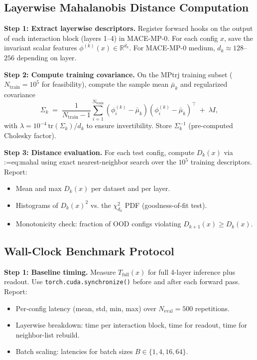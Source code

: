 \documentclass[11pt,a4paper]{article}
\makeatletter
\newcommand{\cref}[1]{\begingroup\def\crefsep{}\@for\crefitem:=#1\do{\crefsep\ref{\crefitem}\def\crefsep{, }}\endgroup}
\makeatother
\begin{document}
\subsection{Layerwise Mahalanobis Distance Computation}\label{sec:empirical:mahal}

\textbf{Step 1: Extract layerwise descriptors.} Register forward hooks on the output of each interaction block (layers 1--4) in MACE-MP-0. For each config $x$, save the invariant scalar features $\phi^{(k)}(x)\in\mathbb{R}^{d_k}$. For MACE-MP-0 medium, $d_k\approx 128$--$256$ depending on layer.

\textbf{Step 2: Compute training covariance.} On the MPtrj training subset ($N_{\text{train}}=10^5$ for feasibility), compute the sample mean $\bar\mu_k$ and regularized covariance
\begin{equation}
    \Sigma_k \;=\; \frac{1}{N_{\text{train}}-1}\sum_{i=1}^{N_{\text{train}}} (\phi^{(k)}_i - \bar\mu_k)(\phi^{(k)}_i - \bar\mu_k)^{\top} \;+\; \lambda I,
\end{equation}
with $\lambda=10^{-4}\,\text{tr}(\Sigma_k)/d_k$ to ensure invertibility. Store $\Sigma_k^{-1}$ (pre-computed Cholesky factor).

\textbf{Step 3: Distance evaluation.} For each test config, compute $D_k(x)$ via \cref{eq:mahal} using exact nearest-neighbor search over the $10^5$ training descriptors. Report:
\begin{itemize}
    \item Mean and max $D_k(x)$ per dataset and per layer.
    \item Histograms of $D_k(x)^2$ vs. the $\chi^2_{d_k}$ PDF (goodness-of-fit test).
    \item Monotonicity check: fraction of OOD configs violating $D_{k+1}(x)\ge D_k(x)$.
\end{itemize}

\subsection{Wall-Clock Benchmark Protocol}\label{sec:empirical:wallclock}

\textbf{Step 1: Baseline timing.} Measure $T_{\text{full}}(x)$ for full 4-layer inference plus readout. Use \texttt{torch.cuda.synchronize()} before and after each forward pass. Report:
\begin{itemize}
    \item Per-config latency (mean, std, min, max) over $N_{\text{eval}}=500$ repetitions.
    \item Layerwise breakdown: time per interaction block, time for readout, time for neighbor-list rebuild.
    \item Batch scaling: latencies for batch sizes $B\in\{1,4,16,64\}$.
\end{itemize}
\end{document}
